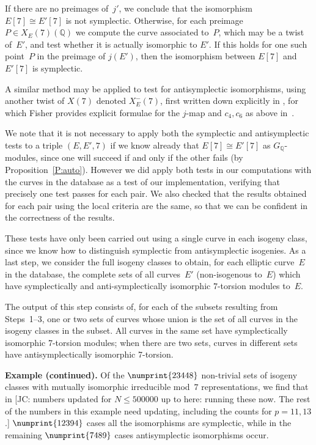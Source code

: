 \documentclass[12pt, reqno]{amsart}
\newcommand{\Q}{\mathbb{Q}}
\numberwithin{equation}{section}
\theoremstyle{definition}
\theoremstyle{remark}
\newcommand{\jc}[1]{{\color{darkgreen} \textsf{[JC: #1]}}}
\begin{document}
If there are no preimages of~$j'$, we conclude that the isomorphism
$E[7]\cong E'[7]$ is not symplectic.  Otherwise, for each preimage
$P\in X_E(7)(\Q)$ we compute the curve associated to~$P$, which may be
a twist of~$E'$, and test whether it is actually isomorphic to $E'$.
If this holds for one such point~$P$ in the preimage of $j(E')$, then
the isomorphism between $E[7]$ and $E'[7]$ is symplectic.

A similar method may be applied to test for antisymplectic
isomorphisms, using another twist of $X(7)$ denoted $X_E^-(7)$, first
written down explicitly in \cite{PSS}, for which Fisher provides
explicit formulae for the $j$-map and $c_4,c_6$ as above
in~\cite{Fisher}.

We note that it is not necessary to apply both the symplectic and
antisymplectic tests to a triple $(E,E',7)$ if we know already that
$E[7]\cong E'[7]$ as $G_\Q$-modules, since one will succeed if and only if the other
fails (by Proposition~\ref{P:auto}).  However we did apply both
tests in our computations with the curves in the database as a test of
our implementation, verifying that precisely one test passes for each
pair.  We also checked that the results obtained for each pair using
the local criteria are the same, so that we can be confident in the
correctness of the results.

These tests have only been carried out using a single curve in each
isogeny class, since we know how to distinguish symplectic from
antisymplectic isogenies.  As a last step, we consider the full isogeny classes
to obtain, for each elliptic curve~$E$ in the database, the complete sets of all curves~$E'$ (non-isogenous to~$E$) which have
symplectically and anti-symplectically isomorphic $7$-torsion modules to~$E$.

The output of this step consists of, for each of the subsets resulting
from Steps~1--3, one or two sets of curves whose union is the set of
all curves in the isogeny classes in the subset.  All curves in the
same set have symplectically isomorphic 7-torsion modules; when there
are two sets, curves in different sets have antisymplectically
isomorphic 7-torsion.




{\bf Example (continued).}
Of the $\numprint{23448}$ non-trivial sets of isogeny classes with mutually
isomorphic irreducible mod~$7$ representations, we find that in
\jc{numbers updated for $N\le500000$ up to here: running these now.  The rest of
the numbers in this example need updating, including the counts for $p=11,13$.}
$\numprint{12394}$ cases all the isomorphisms are symplectic, while in the
remaining $\numprint{7489}$ cases antisymplectic isomorphisms occur.
\end{document}
